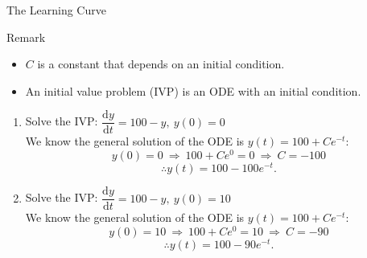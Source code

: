 \documentclass[12pt,a4paper]{article}
\def\d{{\mathrm{d}}}
\begin{document}
\begin{eg}{The Learning Curve}
\begin{rmk}{Remark}
		\begin{itemize}
			\item $C$ is a constant that depends on an initial condition.
			\item An initial value problem (IVP) is an ODE with an initial condition. 
		\end{itemize}
	\end{rmk} 
	\begin{enumerate}
		\item Solve the IVP: $\dfrac{\d y}{\d t}=100-y,\ y(0)=0$\\
		We know the general solution of the ODE is $y(t)=100+Ce^{-t}$: \\
		$$y(0)=0\ \Rightarrow\ 100+Ce^0=0\ \Rightarrow\ C=-100$$
		$$\therefore y(t)=100-100e^{-t}.$$
		\item Solve the IVP: $\dfrac{\d y}{\d t}=100-y,\ y(0)=10$\\
		We know the general solution of the ODE is $y(t)=100+Ce^{-t}$: \\
		$$y(0)=10\ \Rightarrow\ 100+Ce^0=10\ \Rightarrow\ C=-90$$
		$$\therefore y(t)=100-90e^{-t}.$$
	\end{enumerate}
\end{eg}
\end{document}

